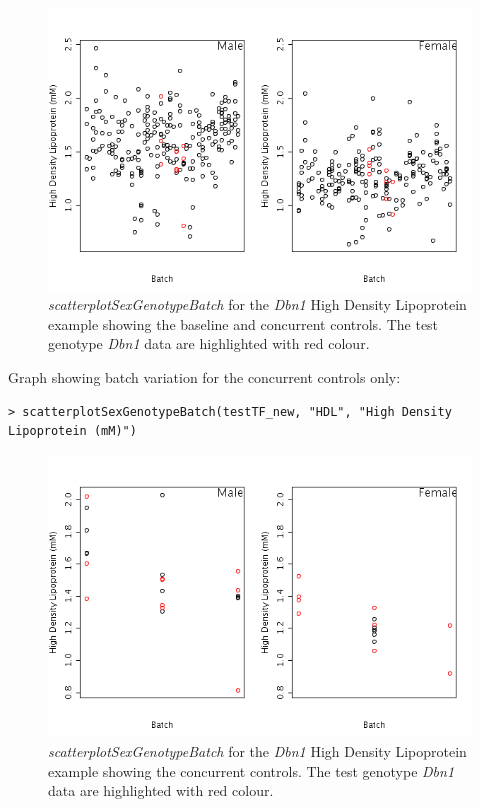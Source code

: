\documentclass[12pt,a4paper]{article}
\begin{document}
\begin{figure}[H]%
\centerline{\includegraphics[scale=0.5]{cs_tf_3.png}}
\caption{\textit{scatterplotSexGenotypeBatch} for the \textit{Dbn1} High Density Lipoprotein example showing the baseline and concurrent controls. The test genotype \textit{Dbn1} data are highlighted with red colour.}\label{fig:cs_tf3}
\end{figure}

Graph showing batch variation for the concurrent controls only:
\begingroup
\fontsize{8pt}{12pt}\selectfont
\begin{verbatim}
> scatterplotSexGenotypeBatch(testTF_new, "HDL", "High Density Lipoprotein (mM)")
\end{verbatim}
\endgroup 

\begin{figure}[H]%
\centerline{\includegraphics[scale=0.5]{cs_tf_4.png}}
\caption{\textit{scatterplotSexGenotypeBatch} for the \textit{Dbn1} High Density Lipoprotein example showing the concurrent controls. The test genotype \textit{Dbn1} data are highlighted with red colour.}\label{fig:cs_tf4}
\end{figure}
\end{document}
